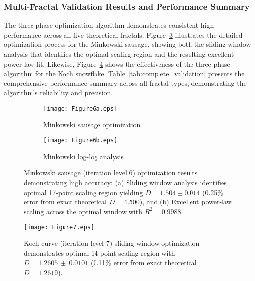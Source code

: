 \documentclass[preprint,12pt]{elsarticle}
\begin{document}
\subsubsection{Multi-Fractal Validation Results and Performance Summary}

The three-phase optimization algorithm demonstrates consistent high performance across all five theoretical fractals. Figure~\ref{fig:minkowski_results} illustrates the detailed optimization process for the Minkowski sausage, showing both the sliding window analysis that identifies the optimal scaling region and the resulting excellent power-law fit. Likewise, Figure~\ref{fig:koch_sliding_window} shows the effectiveness of the three phase algorithm for the Koch snowflake.  Table~\ref{tab:complete_validation} presents the comprehensive performance summary across all fractal types, demonstrating the algorithm's reliability and precision.

\begin{figure}[tbp]
\centering
\begin{subfigure}[b]{0.8\textwidth}
    \centering
    \texttt{[image: Figure6a.eps]}
    \caption{Minkowski sausage optimization}
    \label{fig:minkowski_optimized}
\end{subfigure}

\vspace{0.3cm}

\begin{subfigure}[b]{0.8\textwidth}
    \centering
    \texttt{[image: Figure6b.eps]}
    \caption{Minkowski log-log analysis}
    \label{fig:minkowski_loglog}
\end{subfigure}
\caption{Minkowski sausage (iteration level 6) optimization results demonstrating high accuracy: (a) Sliding window analysis identifies optimal 17-point scaling region yielding $D = 1.504 \pm 0.014$ (0.25\% error from exact theoretical $D = 1.500$), and (b) Excellent power-law scaling across the optimal window with $R^2 = 0.9988$.}
\label{fig:minkowski_results}
\end{figure}

\begin{figure}[tbp]
 \centering
 \texttt{[image: Figure7.eps]}
 \caption{Koch curve (iteration level 7) sliding window optimization demonstrates optimal 14-point scaling region with $D = 1.2605 \ \pm \ 0.0101$ (0.11\% error from exact theoretical $D = 1.2619$).}
 \label{fig:koch_sliding_window}
\end{figure}
\end{document}
